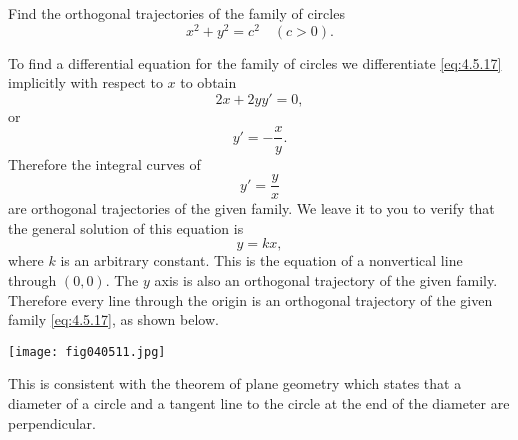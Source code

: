 \documentclass{ximera}
\begin{document}
\begin{example}\label{example:4.5.9}
Find the orthogonal trajectories of the family of circles
\begin{equation} \label{eq:4.5.17}
x^2+y^2=c^2 \quad (c>0).
\end{equation}
 
\begin{explanation}
To find a differential equation for the family of circles we
differentiate \eqref{eq:4.5.17} implicitly with respect to $x$ to obtain
$$
2x+2yy'=0,
$$
or
$$
y'=-\frac{x}{y}.
$$
Therefore the integral curves  of
$$
y'=\frac{y}{x}
$$
are orthogonal trajectories of the given family. We leave it to you to
verify that the general solution of this equation is
$$
y=kx,
$$
where $k$ is an arbitrary constant. This is the equation of a
nonvertical line through $(0,0)$. The $y$ axis is also an orthogonal
trajectory of the given family. Therefore every line through the
origin is an orthogonal trajectory of the given family \eqref{eq:4.5.17}, as shown below.
 
\begin{image}
  \texttt{[image: fig040511.jpg]}
\end{image}
 
This is consistent with the theorem of plane
geometry which states that a diameter of a circle and a tangent line
to the circle at the end of the diameter are perpendicular.
\end{explanation}
\end{example}
 
\end{document}
